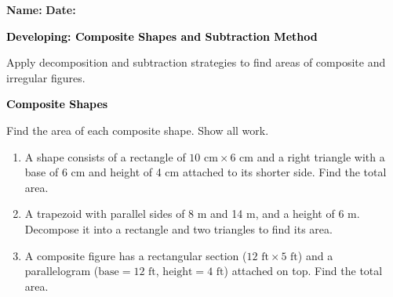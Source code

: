\documentclass[12pt, letterpaper, fleqn]{article}
\begin{document}
\textbf{Name:} \underline{\hspace{5cm}}
\hfill
\textbf{Date:} \underline{\hspace{3cm}}\\

\begin{tcolorbox}[colback=black!10]
    \large\textcolor{black}{\textbf{Developing: Composite Shapes and Subtraction Method}}
\end{tcolorbox}

\vspace{3mm}

\noindent
Apply decomposition and subtraction strategies to find areas of composite and irregular figures.

\vspace{4mm}

\begin{tcolorbox}[colback=black!10]
\large\textcolor{black}{\textbf{Composite Shapes}}
\end{tcolorbox}

\noindent
Find the area of each composite shape. Show all work.

\vspace{3mm}

\begin{enumerate}[itemsep=2.2cm, leftmargin=0.6cm]

\item A shape consists of a rectangle of $10\text{ cm} \times 6\text{ cm}$ and a right triangle with a base of 6 cm and height of 4 cm attached to its shorter side. Find the total area.

\vspace{2cm}

\item A trapezoid with parallel sides of 8 m and 14 m, and a height of 6 m. Decompose it into a rectangle and two triangles to find its area.

\vspace{2cm}

\item A composite figure has a rectangular section ($12\text{ ft} \times 5\text{ ft}$) and a parallelogram ($\text{base} = 12\text{ ft}$, $\text{height} = 4\text{ ft}$) attached on top. Find the total area.

\vspace{2cm}

\end{enumerate}
\end{document}

